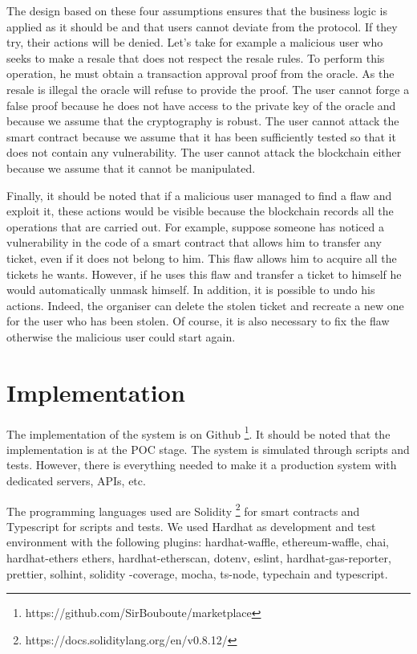 \documentclass[a4paper,11pt,oneside]{report}
\begin{document}
The design based on these four assumptions ensures that the business logic is applied as it should be and that users cannot deviate from the protocol. If they try, their actions will be denied. Let's take for example a malicious user who seeks to make a resale that does not respect the resale rules. To perform this operation, he must obtain a transaction approval proof from the oracle. As the resale is illegal the oracle will refuse to provide the proof. The user cannot forge a false proof because he does not have access to the private key of the oracle and because we assume that the cryptography is robust. The user cannot attack the smart contract because we assume that it has been sufficiently tested so that it does not contain any vulnerability. The user cannot attack the blockchain either because we assume that it cannot be manipulated.

Finally, it should be noted that if a malicious user managed to find a flaw and exploit it, these actions would be visible because the blockchain records all the operations that are carried out. For example, suppose someone has noticed a vulnerability in the code of a smart contract that allows him to transfer any ticket, even if it does not belong to him. This flaw allows him to acquire all the tickets he wants. However, if he uses this flaw and transfer a ticket to himself he would automatically unmask himself. In addition, it is possible to undo his actions. Indeed, the organiser can delete the stolen ticket and recreate a new one for the user who has been stolen. Of course, it is also necessary to fix the flaw otherwise the malicious user could start again.

\chapter{Implementation}
The implementation of the system is on Github \footnote{https://github.com/SirBouboute/marketplace}. It should be noted that the implementation is at the POC stage. The system is simulated through scripts and tests. However, there is everything needed to make it a production system with dedicated servers, APIs, etc.

The programming languages used are Solidity \footnote{https://docs.soliditylang.org/en/v0.8.12/} for smart contracts and Typescript for scripts and tests. We used Hardhat as development and test environment with the following plugins: hardhat-waffle, ethereum-waffle, chai, hardhat-ethers ethers, hardhat-etherscan, dotenv, eslint, hardhat-gas-reporter, prettier, solhint, solidity -coverage, mocha, ts-node, typechain and typescript.
\end{document}
